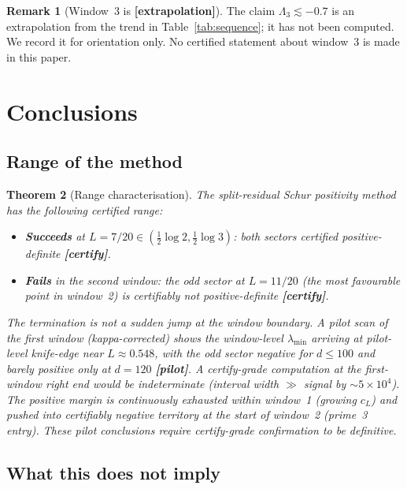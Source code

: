 \documentclass[12pt,a4paper]{amsart}
\theoremstyle{plain}
\newtheorem{theorem}{Theorem}[section]
\theoremstyle{definition}
\newtheorem{remark}[theorem]{Remark}
\newcommand{\cL}{c_L}
\newcommand{\certify}{\textbf{[certify]}}
\newcommand{\pilot}{\textbf{[pilot]}}
\newcommand{\extrap}{\textbf{[extrapolation]}}
\begin{document}
\begin{remark}[Window~3 is \extrap]
The claim $\Lambda_3 \lesssim -0.7$ is an extrapolation from the trend
in Table~\ref{tab:sequence}; it has not been computed.  We record it for
orientation only.  No certified statement about window~3 is made in this
paper.
\end{remark}

\section{Conclusions}
\label{sec:conclusions}

\subsection{Range of the method}

\begin{theorem}[Range characterisation]
\label{thm:range}
The split-residual Schur positivity method has the following certified range:
\begin{itemize}[leftmargin=2em]
  \item \textbf{Succeeds} at $L = 7/20 \in (\tfrac12\log 2, \tfrac12\log 3)$:
    both sectors certified positive-definite \certify.
  \item \textbf{Fails} in the second window: the odd sector at $L = 11/20$
    (the most favourable point in window~2) is certifiably not
    positive-definite \certify.
\end{itemize}
The termination is not a sudden jump at the window boundary.  A pilot scan of
the first window (kappa-corrected) shows the window-level $\lambda_{\min}$
arriving at pilot-level knife-edge near $L \approx 0.548$, with the odd sector
negative for $d \le 100$ and barely positive only at $d=120$ \pilot.  A
certify-grade computation at the first-window right end would be indeterminate
(interval width $\gg$ signal by $\sim 5\times10^4$).  The positive margin is
continuously exhausted \emph{within} window~1 (growing $\cL$) and pushed into
certifiably negative territory at the \emph{start} of window~2 (prime~3
entry).  These pilot conclusions require certify-grade confirmation to be
definitive.
\end{theorem}

\subsection{What this does not imply}
\end{document}
